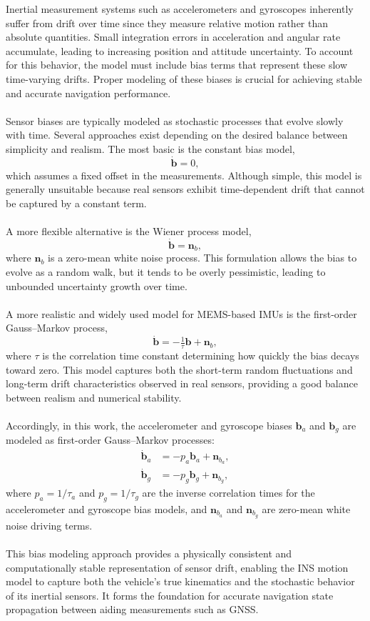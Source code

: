 Inertial measurement systems such as accelerometers and gyroscopes inherently suffer from drift over time since they measure relative motion rather than absolute quantities. Small integration errors in acceleration and angular rate accumulate, leading to increasing position and attitude uncertainty. To account for this behavior, the model must include bias terms that represent these slow time-varying drifts. Proper modeling of these biases is crucial for achieving stable and accurate navigation performance.  
\\ \\
Sensor biases are typically modeled as stochastic processes that evolve slowly with time. Several approaches exist depending on the desired balance between simplicity and realism. The most basic is the constant bias model,
$$
    \dot{\mathbf{b}} = 0,
$$
which assumes a fixed offset in the measurements. Although simple, this model is generally unsuitable because real sensors exhibit time-dependent drift that cannot be captured by a constant term.  
\\ \\
A more flexible alternative is the Wiener process model,
$$
    \dot{\mathbf{b}} = \mathbf{n}_b,
$$
where $\mathbf{n}_b$ is a zero-mean white noise process. This formulation allows the bias to evolve as a random walk, but it tends to be overly pessimistic, leading to unbounded uncertainty growth over time.  
\\ \\
A more realistic and widely used model for MEMS-based IMUs is the first-order Gauss–Markov process,
$$
    \dot{\mathbf{b}} = -\tfrac{1}{\tau}\mathbf{b} + \mathbf{n}_b,
$$
where $\tau$ is the correlation time constant determining how quickly the bias decays toward zero. This model captures both the short-term random fluctuations and long-term drift characteristics observed in real sensors, providing a good balance between realism and numerical stability.  
\\ \\
Accordingly, in this work, the accelerometer and gyroscope biases $\mathbf{b}_a$ and $\mathbf{b}_g$ are modeled as first-order Gauss–Markov processes:
$$
\begin{aligned}
    \dot{\mathbf{b}}_a &= -p_a \mathbf{b}_a + \mathbf{n}_{b_a}, \\
    \dot{\mathbf{b}}_g &= -p_g \mathbf{b}_g + \mathbf{n}_{b_g},
\end{aligned}
$$
where $p_a = 1/\tau_a$ and $p_g = 1/\tau_g$ are the inverse correlation times for the accelerometer and gyroscope bias models, and $\mathbf{n}_{b_a}$ and $\mathbf{n}_{b_g}$ are zero-mean white noise driving terms.  
\\ \\
This bias modeling approach provides a physically consistent and computationally stable representation of sensor drift, enabling the INS motion model to capture both the vehicle’s true kinematics and the stochastic behavior of its inertial sensors. It forms the foundation for accurate navigation state propagation between aiding measurements such as GNSS.







